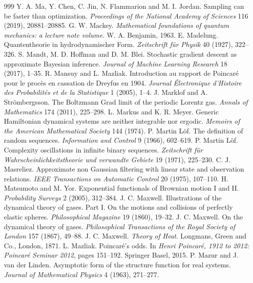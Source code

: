 \begin{thebibliography}{999}
 Y. A. Ma, Y. Chen, C. Jin, N. Flammarion and M. I. Jordan. Sampling can be faster than optimization. \emph{Proceedings of the National Academy of Sciences} 116 (2019), 20881--20885.
 G. W. Mackey. \emph{Mathematical foundations of quantum mechanics: a lecture note volume}. W. A. Benjamin, 1963.
 E. Madelung. Quantentheorie in hydrodynamischer Form. \emph{Zeitschrift f\"ur Physik} 40 (1927), 322--326.
 S. Mandt, M. D. Hoffman and D. M. Blei. Stochastic gradient descent as approximate Bayesian inference. \emph{Journal of Machine Learning Research} 18 (2017), 1--35.
 R. Mansuy and L. Mazliak. Introduction au rapport de Poincar\'e pour le proc\`es en cassation de Dreyfus en 1904. \emph{Journal \'Electronique d'Histoire des Probabilit\'es et de la Statistique} 1 (2005), 1--4.
 J. Marklof and A. Str\"ombergsson. The Boltzmann Grad limit of the periodic Lorentz gas. \emph{Annals of Mathematics} 174 (2011), 225--298.
 L. Markus and K. R. Meyer. Generic Hamiltonian dynamical systems are neither integrable nor ergodic. \emph{Memoirs of the American Mathematical Society} 144 (1974).
 P. Martin L\"of. The definition of random sequences. \emph{Information and Control} 9 (1966), 602--619.
 P. Martin L\"of. Complexity oscillations in infinite binary sequences. \emph{Zeitschrift f\"ur Wahrscheinlichkeitstheorie und verwandte Gebiete} 19 (1971), 225--230.
 C. J. Masreliez. Approximate non Gaussian filtering with linear state and observation relations. \emph{IEEE Transactions on Automatic Control} 20 (1975), 107--110.
 H. Matsumoto and M. Yor. Exponential functionals of Brownian motion I and II. \emph{Probability Surveys} 2 (2005), 312--384.
 J. C. Maxwell. Illustrations of the dynamical theory of gases. Part I. On the motions and collisions of perfectly elastic spheres. \emph{Philosophical Magazine} 19 (1860), 19--32.
 J. C. Maxwell. On the dynamical theory of gases. \emph{Philosophical Transactions of the Royal Society of London} 157 (1867), 49--88.
 J. C. Maxwell. \emph{Theory of Heat}. Longmans, Green and Co., London, 1871.
 L. Mazliak. Poincar\'e's odds. In \emph{Henri Poincar\'e, 1912 to 2012: Poincar\'e Seminar 2012}, pages 151--192. Springer Basel, 2015.
 P. Mazur and J. van der Linden. Asymptotic form of the structure function for real systems. \emph{Journal of Mathematical Physics} 4 (1963), 271--277.

\end{thebibliography}
